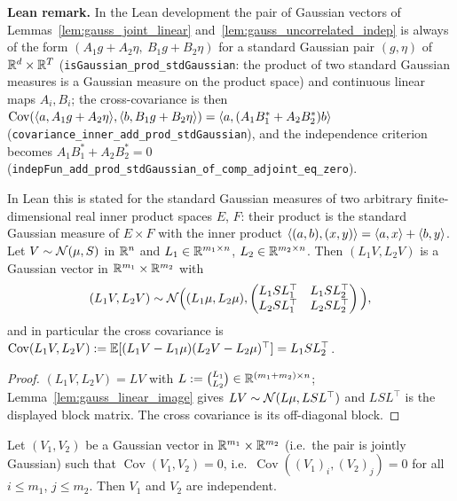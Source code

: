\textbf{Lean remark.} In the Lean development the pair of Gaussian vectors of
Lemmas~\ref{lem:gauss_joint_linear} and~\ref{lem:gauss_uncorrelated_indep} is always of the
form $(A_1g + A_2\eta,\ B_1g + B_2\eta)$ for a standard Gaussian pair $(g,\eta)$ of
$\mathbb{R}^{d}\times\mathbb{R}^{T}$ (\texttt{isGaussian\_prod\_stdGaussian}: the product of two standard
Gaussian measures is a Gaussian measure on the product space) and continuous linear maps
$A_i, B_i$; the cross-covariance is then
$\operatorname{Cov}(\langle a, A_1g+A_2\eta \rangle, \langle b, B_1g+B_2\eta \rangle) = \langle a, (A_1B_1^* + A_2B_2^*)b \rangle$
(\texttt{covariance\_inner\_add\_prod\_stdGaussian}), and the independence criterion becomes
$A_1B_1^* + A_2B_2^* = 0$
(\texttt{indepFun\_add\_prod\_stdGaussian\_of\_comp\_adjoint\_eq\_zero}).

\begin{lemma}\label{lem:gauss_joint_linear}
\leanok
In Lean this is stated for the standard Gaussian measures of two arbitrary
finite-dimensional real inner product spaces $E$, $F$: their product is the standard Gaussian
measure of $E \times F$ with the inner product $\langle (a,b), (x,y) \rangle = \langle a, x \rangle + \langle b, y \rangle$.
Let $V \sim \mathcal{N}(\mu,S)$ in $\mathbb{R}^n$ and $L_1 \in \mathbb{R}^{m_1\times n}$, $L_2 \in \mathbb{R}^{m_2\times n}$.
Then $(L_1 V, L_2 V)$ is a Gaussian vector in $\mathbb{R}^{m_1}\times\mathbb{R}^{m_2}$ with
\[
  (L_1V, L_2V) \sim \mathcal{N}\Big( (L_1\mu, L_2\mu),
  \begin{pmatrix} L_1SL_1^\top & L_1SL_2^\top \\ L_2SL_1^\top & L_2SL_2^\top\end{pmatrix}\Big),
\]
and in particular the cross covariance is
$\operatorname{Cov}(L_1V, L_2V) := \mathbb{E}[(L_1V - L_1\mu)(L_2V - L_2\mu)^\top] = L_1 S L_2^\top$.
\end{lemma}

\begin{proof}
\leanok
{}
$(L_1V, L_2V) = LV$ with $L := \binom{L_1}{L_2} \in \mathbb{R}^{(m_1+m_2)\times n}$;
Lemma~\ref{lem:gauss_linear_image} gives $LV \sim \mathcal{N}(L\mu, LSL^\top)$ and
$LSL^\top$ is the displayed block matrix. The cross covariance is its off-diagonal block.
\end{proof}

\begin{lemma}\label{lem:gauss_uncorrelated_indep}
\leanok
{}
Let $(V_1, V_2)$ be a Gaussian vector in $\mathbb{R}^{m_1}\times\mathbb{R}^{m_2}$ (i.e.\ the pair is jointly
Gaussian) such that $\operatorname{Cov}(V_1, V_2) = 0$, i.e.\
$\operatorname{Cov}((V_1)_i, (V_2)_j) = 0$ for all $i \le m_1$, $j \le m_2$. Then $V_1$ and
$V_2$ are independent.
\end{lemma}

